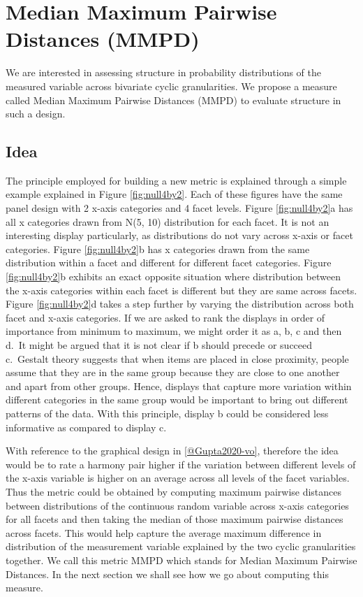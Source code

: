 \documentclass[
]{article}
\begin{document}
\hypertarget{median-maximum-pairwise-distances-mmpd}{%
\section{Median Maximum Pairwise Distances (MMPD)}\label{median-maximum-pairwise-distances-mmpd}}

We are interested in assessing structure in probability distributions of the measured variable across bivariate cyclic granularities. We propose a measure called Median Maximum Pairwise Distances (MMPD) to evaluate structure in such a design.

\hypertarget{idea}{%
\subsection{Idea}\label{idea}}

The principle employed for building a new metric is explained through a simple example explained in Figure \ref{fig:null4by2}. Each of these figures have the same panel design with 2 x-axis categories and 4 facet levels. Figure \ref{fig:null4by2}a has all x categories drawn from N(5, 10) distribution for each facet. It is not an interesting display particularly, as distributions do not vary across x-axis or facet categories. Figure \ref{fig:null4by2}b has x categories drawn from the same distribution within a facet and different for different facet categories. Figure \ref{fig:null4by2}b exhibits an exact opposite situation where distribution between the x-axis categories within each facet is different but they are same across facets. Figure \ref{fig:null4by2}d takes a step further by varying the distribution across both facet and x-axis categories. If we are asked to rank the displays in order of importance from minimum to maximum, we might order it as a, b, c and then d.~It might be argued that it is not clear if b should precede or succeed c.~Gestalt theory suggests that when items are placed in close proximity, people assume that they are in the same group because they are close to one another and apart from other groups. Hence, displays that capture more variation within different categories in the same group would be important to bring out different patterns of the data. With this principle, display b could be considered less informative as compared to display c.

With reference to the graphical design in \ref{@Gupta2020-vo}, therefore the idea would be to rate a harmony pair higher if the variation between different levels of the x-axis variable is higher on an average across all levels of the facet variables. Thus the metric could be obtained by computing maximum pairwise distances between distributions of the continuous random variable across x-axis categories for all facets and then taking the median of those maximum pairwise distances across facets. This would help capture the average maximum difference in distribution of the measurement variable explained by the two cyclic granularities together. We call this metric MMPD which stands for Median Maximum Pairwise Distances. In the next section we shall see how we go about computing this measure.
\end{document}
